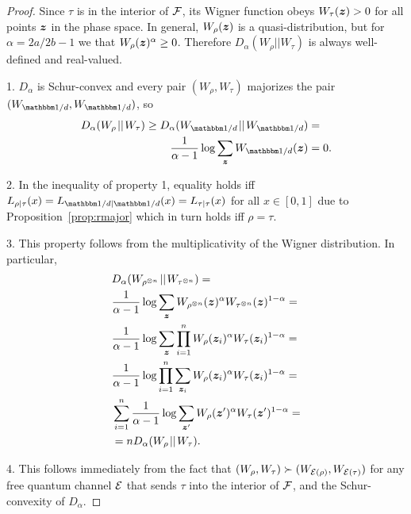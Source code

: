 \documentclass[pra,
aps,
twocolumn,
superscriptaddress,
groupedaddress,
nofootinbib,
reprint
]{revtex4-1}
\begin{document}
\begin{proof}
	Since $\tau$ is in the interior of ${\mathcal F}$, its Wigner function obeys $W_\tau(\bm{z}) >0$ for all points $\bm{z}$ in the phase space. 
In general, $W_\rho(\bm{z})$ is a quasi-distribution, but for $\alpha = 2a/2b-1$ we that $W_{\rho}(\bm{z})^\alpha \geq 0$. 
Therefore $D_\alpha (W_\rho || W_\tau)$ is always well-defined and real-valued.

1. $D_\alpha$ is Schur-convex and every pair $(W_{\rho}, W_{\tau})$ majorizes the pair $(W_{\I/d}, W_{\I/d})$, so
\begin{align}
	D_\alpha(W_{\rho} \hspace{1pt}||\hspace{1pt} W_{\tau}) \geq D_\alpha(W_{\I/d} \hspace{1pt}||\hspace{1pt} W_{\I/d}) &= \nonumber\\
	\frac{1}{\alpha-1} \log \sum_{\bmz} W_{\I/d}(\bmz) &= 0.
\end{align}

2. In the inequality of property 1, equality holds iff $L_{\rho|\tau}(x) = L_{\I/d|\I/d}(x) = L_{\tau|\tau}(x)$ for all $x\in [0,1]$ due to Proposition~\ref{prop:rmajor} which in turn holds iff $\rho = \tau$.

3. This property follows from the multiplicativity of the Wigner distribution.
In particular,
\begin{align}
	&D_\alpha(W_{\rho^{\otimes n}} \hspace{1pt}||\hspace{1pt} W_{\tau^{\otimes n}}) = \nonumber\\
	&\frac{1}{\alpha - 1} \log \sum_{\bm{z}} W_{\rho^{\otimes n}}(\bm{z})^\alpha W_{\tau^{\otimes n}}(\bm{z})^{1-\alpha} = \nonumber\\
	&\frac{1}{\alpha - 1} \log \sum_{\bm{z}} \prod_{i=1}^n W_{\rho}(\bm{z}_i)^\alpha W_{\tau}(\bm{z}_i)^{1-\alpha} = \nonumber\\
	&\frac{1}{\alpha - 1} \log \prod_{i=1}^n \sum_{\bm{z}_i} W_{\rho}(\bm{z}_i)^\alpha W_{\tau}(\bm{z}_i)^{1-\alpha} = \nonumber\\
	&\sum_{i=1}^n \frac{1}{\alpha - 1} \log \sum_{\bm{z}'} W_{\rho}(\bm{z}')^\alpha W_{\tau}(\bm{z}')^{1-\alpha} = \nonumber\\
	&= n D_{\alpha}(W_\rho \hspace{1pt}||\hspace{1pt} W_\tau).
\end{align}

4. This follows immediately from the fact that $(W_\rho, W_\tau) \succ (W_{{\mathcal E}(\rho)}, W_{{\mathcal E}(\tau)})$ for any free quantum channel ${\mathcal E}$ that sends $\tau$ into the interior of ${\mathcal F}$, and the Schur-convexity of $D_\alpha$.
\end{proof}
\end{document}
